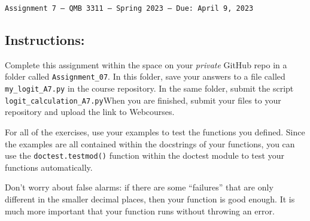 \documentclass[11pt]{exam}
\begin{document}
\texttt{Assignment 7 --- QMB 3311 ---  Spring 2023  --- Due: April 9, 2023}

\subsection*{Instructions:}

Complete this assignment within the space on your \textit{private} GitHub repo in a folder called \texttt{Assignment\_07}. In this folder, save your answers to a file called \texttt{my\_logit\_A7.py} in the course repository. In the same folder, submit the script \texttt{logit\_calculation\_A7.py}When you are finished, submit your files to your repository and upload the link to Webcourses.

For all of the exercises, use your examples to test the functions you defined. Since the examples are all contained within the docstrings of your functions, you can use the
\texttt{doctest.testmod()} function within the doctest module to test your functions automatically.

Don't worry about false alarms: if there are some ``failures'' that are only different in the smaller decimal places, then your function is good enough. It is much more important that your function runs without throwing an error.
\end{document}
